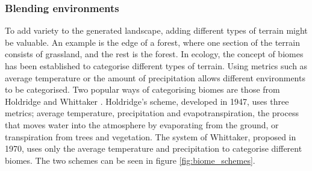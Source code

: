 \documentclass{article}
\begin{document}
\subsubsection{Blending environments}
To add variety to the generated landscape, adding different types of terrain might be valuable. An example is the edge of a forest, where one section of the terrain consists of grassland, and the rest is the forest. In ecology, the concept of biomes has been established to categorise different types of terrain. Using metrics such as average temperature or the amount of precipitation allows different environments to be categorised. Two popular ways of categorising biomes are those from Holdridge and Whittaker \cite{mucina_biome_2019}. Holdridge's scheme, developed in 1947, uses three metrics; average temperature, precipitation and evapotranspiration, the process that moves water into the atmosphere by evaporating from the ground, or transpiration from trees and vegetation. The system of Whittaker, proposed in 1970, uses only the average temperature and precipitation to categorise different biomes. The two schemes can be seen in figure \ref{fig:biome_schemes}.
\end{document}
